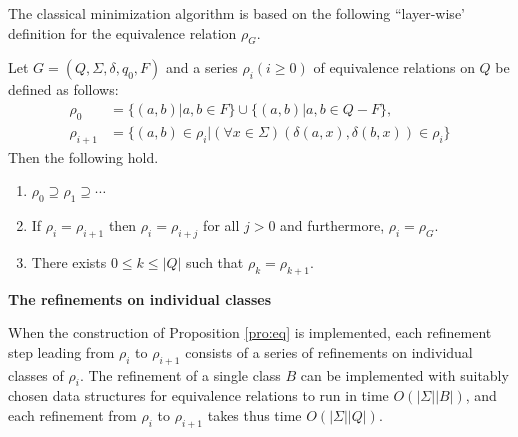 The classical minimization algorithm is based on the following ``layer-wise' definition for the equivalence relation $\rho_G$.

\begin{proposition} \label{pro:eq}
	Let $G=(Q,\Sigma,\delta,q_0,F)$ and a series $\rho_i (i\ge 0)$ of equivalence relations on $Q$ be defined as follows:
	\begin{align*}
	\rho_0 &=\{(a,b)|a,b\in F \} \cup \{(a,b)|a,b\in Q-F \},\\
	\rho_{i+1} &=\{(a,b)\in\rho_i|(\forall x\in \Sigma) (\delta(a,x),\delta(b,x))\in\rho_i \}
	\end{align*}
	Then the following hold.
	\begin{enumerate} [(1) ]
		\item $\rho_0\supseteq\rho_1\supseteq\cdots$
		\item If $\rho_i=\rho_{i+1}$ then $\rho_i=\rho_{i+j}$ for all $j>0$ and furthermore, $\rho_i=\rho_G$.
		\item There exists $0\le k\le |Q|$ such that $\rho_k=\rho_{k+1}$. 
	\end{enumerate}
\end{proposition}

\textbf{ The refinements on individual classes}

When the construction of Proposition \ref{pro:eq} is implemented, each refinement step leading from $\rho_i$ to $\rho_{i+1}$ consists of a series of refinements on individual classes of $\rho_i$. The refinement of a single class $B$ can be implemented with suitably chosen data structures for equivalence relations to run in time $O(|\Sigma||B|)$, and each refinement from $\rho_i$ to $\rho_{i+1}$
takes thus time $O(|\Sigma||Q|)$.

